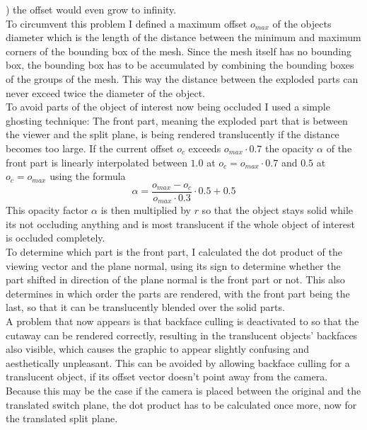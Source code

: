 ) the offset would even grow to infinity.\\
To circumvent this problem I defined a maximum offset $o_{max}$ of the objects diameter which is the length of the distance between the minimum and maximum corners of the bounding box of the mesh. Since the mesh itself has no bounding box, the bounding box has to be accumulated by combining the bounding boxes of the groups of the mesh. This way the distance between the exploded parts can never exceed twice the diameter of the object.\\
To avoid parts of the object of interest now being occluded I used a simple ghosting technique: 
The front part, meaning the exploded part that is between the viewer and the split plane, is being rendered translucently if the distance becomes too large.
If the current offset $o_c$ exceeds $o_{max} \cdot 0.7$ the opacity $\alpha$ of the front part is linearly interpolated between $1.0$ at $o_c = o_{max} \cdot 0.7$ and $0.5$ at  $o_c = o_{max}$ using the formula
\begin{equation}
	\alpha = \frac{o_{max}-o_c}{o_{max} \cdot 0.3} \cdot 0.5 + 0.5
\end{equation}
This opacity factor $\alpha$ is then multiplied by $r$ so that the object stays solid while its not occluding anything and is most translucent if the whole object of interest is occluded completely.\\
To determine which part is the front part, I calculated the dot product of the viewing vector and the plane normal, using its sign to determine whether the part shifted in direction of the plane normal is the front part or not. This also determines in which order the parts are rendered, with the front part being the last, so that it can be translucently blended over the solid parts.\\
A problem that now appears is that backface culling is deactivated to so that the cutaway can be rendered correctly, resulting in the translucent objects' backfaces also visible, which causes the graphic to appear slightly confusing and aesthetically unpleasant. This can be avoided by allowing backface culling for a translucent object, if its offset vector doesn't point away from the camera. Because this may be the case if the camera is placed between the original and the translated switch plane, the dot product has to be calculated once more, now for the translated split plane.\\

